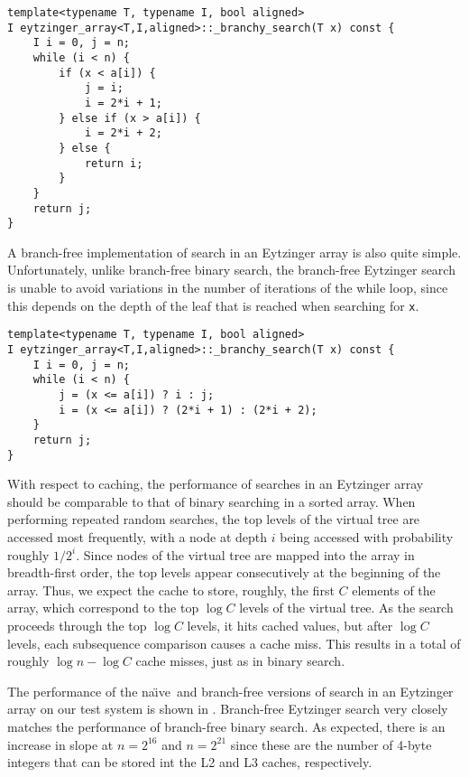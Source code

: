 \documentclass{patmorin}
\newcommand{\naive}{na\"{\i}ve}
\begin{document}
\begin{listing}
\begin{verbatim}
template<typename T, typename I, bool aligned>
I eytzinger_array<T,I,aligned>::_branchy_search(T x) const {
	I i = 0, j = n;
	while (i < n) {
		if (x < a[i]) {
			j = i;
			i = 2*i + 1;
		} else if (x > a[i]) {
			i = 2*i + 2;
		} else {
			return i;
		}
	}
	return j;
}
\end{verbatim}
\caption{A \naive\ implementation of search in an Eytzinger array.}
\end{listing}

A branch-free implementation of search in an Eytzinger array is also
quite simple. Unfortunately, unlike branch-free binary search, the
branch-free Eytzinger search is unable to avoid variations in the number
of iterations of the while loop, since this depends on the depth of the
leaf that is reached when searching for \texttt{x}.

\begin{listing}
\begin{verbatim}
template<typename T, typename I, bool aligned>
I eytzinger_array<T,I,aligned>::_branchy_search(T x) const {
    I i = 0, j = n;
    while (i < n) {
        j = (x <= a[i]) ? i : j;
        i = (x <= a[i]) ? (2*i + 1) : (2*i + 2);
    }
    return j;
}
\end{verbatim}
\caption{Branch-free implementation of search in an Eytzinger array.}
\end{listing}

With respect to caching, the performance of searches in an Eytzinger
array should be comparable to that of binary searching in a sorted array.
When performing repeated random searches, the top levels of the virtual
tree are accessed most frequently, with a node at depth $i$ being accessed
with probability roughly $1/2^i$.  Since nodes of the virtual tree are
mapped into the array in breadth-first order, the top levels appear
consecutively at the beginning of the array. Thus, we expect the cache
to store, roughly, the first $C$ elements of the array, which correspond
to the top $\log C$ levels of the virtual tree.  As the search proceeds
through the top $\log C$ levels, it hits cached values, but after $\log C$
levels, each subsequence comparison causes a cache miss.  This results in
a total of roughly $\log n-\log C$ cache misses, just as in binary search.

The performance of the \naive\ and branch-free versions of search in
an Eytzinger array on our test system is shown in .
Branch-free Eytzinger search very closely matches the performance of
branch-free binary search. As expected, there is an increase in slope at
$n=2^{16}$ and $n=2^{21}$ since these are the number of 4-byte integers
that can be stored int the L2 and L3 caches, respectively.
\end{document}
